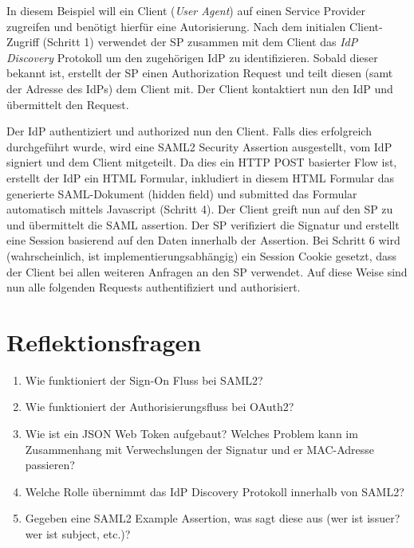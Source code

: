 In diesem Beispiel will ein Client (\textit{User Agent}) auf einen Service Provider zugreifen und benötigt hierfür eine Autorisierung. Nach dem initialen Client-Zugriff (Schritt 1) verwendet der SP zusammen mit dem Client das \textit{IdP Discovery} Protokoll um den zugehörigen IdP zu identifizieren. Sobald dieser bekannt ist, erstellt der SP einen Authorization Request und teilt diesen (samt der Adresse des IdPs) dem Client mit. Der Client kontaktiert nun den IdP und übermittelt den Request.

Der IdP authentiziert und authorized nun den Client. Falls dies erfolgreich durchgeführt wurde, wird eine SAML2 Security Assertion ausgestellt, vom IdP signiert und dem Client mitgeteilt. Da dies ein HTTP POST basierter Flow ist, erstellt der IdP ein HTML Formular, inkludiert in diesem HTML Formular das generierte SAML-Dokument (hidden field) und submitted das Formular automatisch mittels Javascript (Schritt 4). Der Client greift nun auf den SP zu und übermittelt die SAML assertion. Der SP verifiziert die Signatur und erstellt eine Session basierend auf den Daten innerhalb der Assertion. Bei Schritt 6 wird (wahrscheinlich, ist implementierungsabhängig) ein Session Cookie gesetzt, dass der Client bei allen weiteren Anfragen an den SP verwendet. Auf diese Weise sind nun alle folgenden Requests authentifiziert und authorisiert.

\section{Reflektionsfragen}

\begin{enumerate}
	\item Wie funktioniert der Sign-On Fluss bei SAML2?
	\item Wie funktioniert der Authorisierungsfluss bei OAuth2?
	\item Wie ist ein JSON Web Token aufgebaut? Welches Problem kann im Zusammenhang mit Verwechslungen der Signatur und er MAC-Adresse passieren?
	\item Welche Rolle übernimmt das IdP Discovery Protokoll innerhalb von SAML2?
	\item Gegeben eine SAML2 Example Assertion, was sagt diese aus (wer ist issuer? wer ist subject, etc.)?
\end{enumerate}
